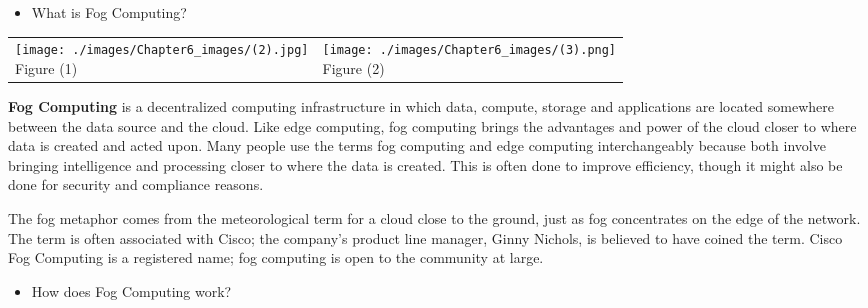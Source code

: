 \documentclass[11pt]{article}
\begin{document}
\begin{itemize}
\item {\Large \textcolor[HTML]{2F5496}{What is Fog Computing?}}
\end{itemize}

\begin{table}[H]
\begin{adjustbox}{max width=\textwidth}
\begin{tabular}{p{8.45cm}p{7.92cm}}
\multicolumn{1}{p{8.45cm}}{\centering
\texttt{[image: ./images/Chapter6\_images/(2).jpg]}
\newline
\centering
\textcolor[HTML]{2F5496}{Figure (}1\textcolor[HTML]{2F5496}{)}} & 
\multicolumn{1}{p{7.92cm}}{
\centering
\texttt{[image: ./images/Chapter6\_images/(3).png]}
\newline
\centering
\textcolor[HTML]{2F5496}{Figure (}2\textcolor[HTML]{2F5496}{)}}
\end{tabular}
\end{adjustbox}
\end{table}

\vspace{2\baselineskip}
\textbf{Fog Computing} is a decentralized computing infrastructure in which data, compute, storage and applications are located somewhere between the data source and the cloud. Like edge computing, fog computing brings the advantages and power of the cloud closer to where data is created and acted upon. Many people use the terms fog computing and edge computing interchangeably because both involve bringing intelligence and processing closer to where the data is created. This is often done to improve efficiency, though it might also be done for security and compliance reasons.
	
The fog metaphor comes from the meteorological term for a cloud close to the ground, just as fog concentrates on the edge of the network. The term is often associated with Cisco; the company's product line manager, Ginny Nichols, is believed to have coined the term. Cisco Fog Computing is a registered name; fog computing is open to the community at large.



\newpage

\vspace{1\baselineskip}
\begin{itemize}
\item {\Large \textcolor[HTML]{2F5496}{How does Fog Computing work?}}
\end{itemize}
\end{document}
